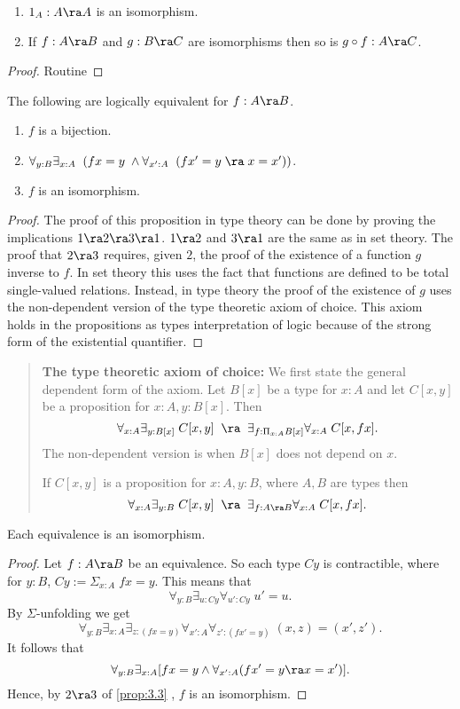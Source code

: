 \begin{thm} $\;$
\begin{enumerate}
\item $1_A:A\ra A$ is an isomorphism.
\item If $f:A\ra B$ and $g:B\ra C$ are isomorphisms then so is $g\circ f:A\ra C$.
\end{enumerate}
\end{thm}
\begin{proof} Routine
\end{proof}
\begin{thm}\label{prop:3.3}
The following are logically equivalent for $f:A\ra B$.
\begin{enumerate}
\item $f$ is a bijection.
\item $\forall_{y:B}\exists_{x:A}\;\; (fx=y\;\wedge \forall_{x':A}\;\; (fx'=y\;\ra\; x=x'))$.
\item $f$ is an isomorphism.
\end{enumerate}
\end{thm}
\begin{proof}
The proof of this proposition in type theory can be done by proving the implications $1\ra 2\ra 3\ra 1$.  $1\ra 2$ and $3\ra 1$ are the same as in set theory.  The proof that $2\ra 3$ requires, given $2$, the proof of the existence of a function $g$ inverse to $f$.  In set theory this uses the fact that functions are defined to be total single-valued relations.  Instead, in type theory the proof of the existence of $g$
uses the non-dependent version of the type theoretic axiom of choice.  This axiom holds in the propositions as types interpretation of logic because of the strong form of the existential quantifier.
\end{proof}
\begin{quote}
{\bf \large The type theoretic axiom of choice: }
We first state the general dependent form of the axiom.  Let $B[x]$ be a type for $x:A$ and let $C[x,y]$ be a proposition for $x:A,y:B[x]$.  Then 
  \[ \forall_{x:A}\exists_{y:B[x]}\; C[x,y]\;\;\ra\;\; \exists_{f:\Pi_{x:A}B[x]}\forall_{x:A}\; C[x,fx].\]
The non-dependent version is when $B[x]$ does not depend on $x$.

If $C[x,y]$ is a proposition for $x:A, y:B$, where $A,B$ are types then
 \[ \forall_{x:A}\exists_{y:B}\; C[x,y]\;\;\ra\;\; \exists_{f:A\ra B}\forall_{x:A}\; C[x,fx].\]
\end{quote}

\begin{thm}\label{prop:3.4}
Each equivalence is an isomorphism.
\end{thm}
\begin{proof} Let $f:A\ra B$ be an equivalence.  So each type $Cy$ is contractible, where for $y:B$, $Cy := \Sigma_{x:A}\; fx=y$.  This means that
  \[ \forall_{y:B}\exists_{u:Cy}\forall_{u':Cy}\; u'=u.\]
By $\Sigma$-unfolding we get
  \[ \forall_{y:B}\exists_{x:A}\exists_{z:(fx=y)}
                            \forall_{x':A}\forall_{z':(fx'=y)}\; (x,z)=(x',z').
  \]
It follows that
  \[ \forall_{y:B}\exists_{x:A}[fx=y\wedge\forall_{x':A}(fx'=y\ra  x=x')].
  \]
Hence, by $2\ra 3$ of \autoref{prop:3.3} , $f$ is an isomorphism.
\end{proof} 


